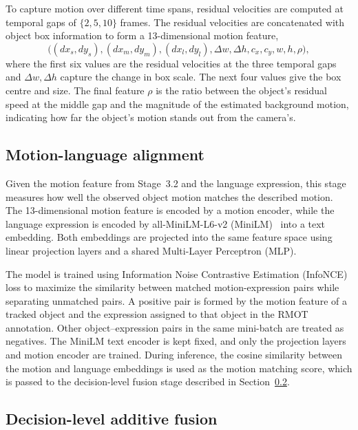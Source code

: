 \documentclass[sigconf,anonymous,nonacm]{acmart}
\begin{document}
To capture motion over different time spans, residual velocities are computed at temporal gaps of $\{2,5,10\}$ frames. The residual velocities are concatenated with object box information to form a 13-dimensional motion feature,
\begin{equation}
\bigl((dx_s,dy_s),(dx_m,dy_m),(dx_l,dy_l),\Delta w,\Delta h,c_x,c_y,w,h,\rho\bigr),
\label{eq:descriptor}
\end{equation}
where the first six values are the residual velocities at the three temporal gaps and $\Delta w, \Delta h$ capture the change in box scale. The next four values give the box centre and size. The final feature $\rho$ is the ratio between the object's residual speed at the middle gap and the magnitude of the estimated background motion, indicating how far the object's motion stands out from the camera's.

\subsection{Motion-language alignment}
\label{sec:align}

Given the motion feature from Stage~3.2 and the language expression, this stage measures how well the observed object motion matches the described motion. The 13-dimensional motion feature is encoded by a motion encoder, while the language expression is encoded by all-MiniLM-L6-v2 (MiniLM)~\cite{sbert} into a text embedding. Both embeddings are projected into the same feature space using linear projection layers and a shared Multi-Layer Perceptron (MLP).

The model is trained using Information Noise Contrastive Estimation (InfoNCE)~\cite{infonce} loss to maximize the similarity between matched motion-expression pairs while separating unmatched pairs. A positive pair is formed by the motion feature of a tracked object and the expression assigned to that object in the RMOT annotation. Other object--expression pairs in the same mini-batch are treated as negatives. The MiniLM text encoder is kept fixed, and only the projection layers and motion encoder are trained. During inference, the cosine similarity between the motion and language embeddings is used as the motion matching score, which is passed to the decision-level fusion stage described in Section~\ref{sec:fusion}.

\subsection{Decision-level additive fusion}
\label{sec:fusion}
\end{document}
